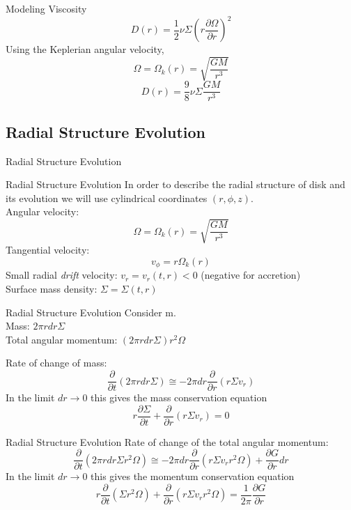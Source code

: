 \documentclass{beamer}
\begin{document}
\begin{frame}{Modeling Viscosity}
	\[D(r) = \frac{1}{2} \nu \Sigma \left( r \frac{\partial \Omega}{\partial r} \right)^2 \]
	\pause
	Using the Keplerian  angular velocity,
	\[ \Omega = \Omega_k (r) = \sqrt{\frac{GM}{r^3}} \]
	\pause
	\[D(r) = \frac{9}{8} \nu \Sigma \frac{GM}{r^3} \]
\end{frame}


\subsection{Radial Structure Evolution}    

\begin{frame}
\Huge
Radial Structure Evolution
\end{frame}

\begin{frame}{Radial Structure Evolution}
	In order to describe the radial structure of disk and its evolution we will use cylindrical coordinates $(r, \phi, z)$.\\
	\pause
	Angular velocity:
	\[ \Omega = \Omega_k (r) = \sqrt{\frac{GM}{r^3}} \]
	\pause
	Tangential velocity:
	\[v_\phi = r \Omega_k (r)\]
	\pause
	Small radial \textit{drift} velocity: $v_r = v_r (t,r) < 0 $ (negative for accretion)\\
	\pause
	Surface mass density: $\Sigma = \Sigma (t,r)$
\end{frame}

\begin{frame}{Radial Structure Evolution}
	Consider m.\\
	\pause	
	Mass: $2\pi r  dr \Sigma$\\
	\pause
	Total angular momentum: $(2\pi r dr \Sigma) r^2 \Omega$
	\pause
	\bigskip
	
	Rate of change of mass:
	\[ \frac{\partial }{\partial t} \left( 2\pi r  dr \Sigma \right) \cong -2\pi dr \frac{\partial}{\partial r} \left( r \Sigma v_r \right)\] 
	 \pause
	 In the limit $dr \rightarrow 0$ this gives the mass conservation equation
	 \[ r \frac{\partial \Sigma}{\partial t} + \frac{\partial}{\partial r} \left( r \Sigma v_r \right) = 0\] 
\end{frame}

\begin{frame}{Radial Structure Evolution}
	Rate of change of the total angular momentum:
	\[ \frac{\partial }{\partial t} \left( 2\pi r dr \Sigma r^2 \Omega \right) \cong -2\pi dr \frac{\partial}{\partial r} \left( r \Sigma v_r r^2 \Omega \right) + \frac{\partial G}{\partial r} dr \] 
	 \pause
	 In the limit $dr \rightarrow 0$ this gives the momentum conservation equation
	 \[ r \frac{\partial }{\partial t} \left( \Sigma r^2 \Omega \right) + \frac{\partial}{\partial r} \left( r \Sigma v_r  r^2 \Omega\right) = \frac{1}{2\pi} \frac{\partial G}{\partial r}\] 
\end{frame}
\end{document}
